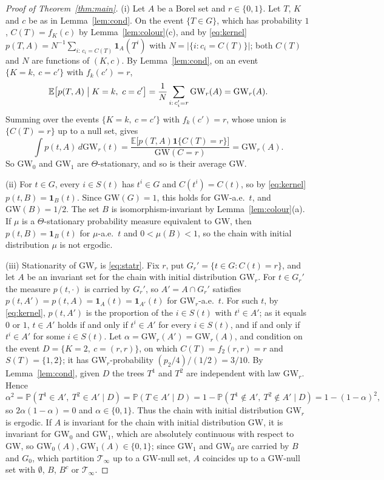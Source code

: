 \documentclass[11pt]{amsart}
\theoremstyle{remark}
\numberwithin{equation}{section}
\newcommand{\Pp}{\mathbb P}
\newcommand{\E}{\mathbb E}
\newcommand{\T}{\mathcal T}
\newcommand{\GW}{\mathrm{GW}}
\newcommand{\one}{\mathbf 1}
\begin{document}
\begin{proof}[Proof of Theorem~\ref{thm:main}]
(i) Let $A$ be a Borel set and $r\in\{0,1\}$. Let $T$, $K$ and $c$ be as in Lemma~\ref{lem:cond}. On the event $\{T\in G\}$, which has probability $1$, $C(T)=f_K(c)$ by Lemma~\ref{lem:colour}(c), and by \eqref{eq:kernel} $p(T,A)=N^{-1}\sum_{i:\,c_i=C(T)}\one_A(T^i)$ with $N=|\{i:c_i=C(T)\}|$; both $C(T)$ and $N$ are functions of $(K,c)$. By Lemma~\ref{lem:cond}, on an event $\{K=k,\ c=c'\}$ with $f_k(c')=r$,
\[
\E\bigl[p(T,A)\bigm|K=k,\ c=c'\bigr]=\frac1N\sum_{i:\,c'_i=r}\GW_r(A)=\GW_r(A).
\]
Summing over the events $\{K=k,\ c=c'\}$ with $f_k(c')=r$, whose union is $\{C(T)=r\}$ up to a null set, gives
\begin{equation}\label{eq:statr}
\int p(t,A)\,d\GW_r(t)=\frac{\E\bigl[p(T,A)\one\{C(T)=r\}\bigr]}{\GW(C=r)}=\GW_r(A).
\end{equation}
So $\GW_0$ and $\GW_1$ are $\Theta$-stationary, and so is their average $\GW$.

(ii) For $t\in G$, every $i\in S(t)$ has $t^i\in G$ and $C(t^i)=C(t)$, so by \eqref{eq:kernel} $p(t,B)=\one_B(t)$. Since $\GW(G)=1$, this holds for $\GW$-a.e.\ $t$, and $\GW(B)=1/2$. The set $B$ is isomorphism-invariant by Lemma~\ref{lem:colour}(a). If $\mu$ is a $\Theta$-stationary probability measure equivalent to $\GW$, then $p(t,B)=\one_B(t)$ for $\mu$-a.e.\ $t$ and $0<\mu(B)<1$, so the chain with initial distribution $\mu$ is not ergodic.

(iii) Stationarity of $\GW_r$ is \eqref{eq:statr}. Fix $r$, put $G_r'=\{t\in G:C(t)=r\}$, and let $A$ be an invariant set for the chain with initial distribution $\GW_r$. For $t\in G_r'$ the measure $p(t,\cdot)$ is carried by $G_r'$, so $A'=A\cap G_r'$ satisfies $p(t,A')=p(t,A)=\one_A(t)=\one_{A'}(t)$ for $\GW_r$-a.e.\ $t$. For such $t$, by \eqref{eq:kernel}, $p(t,A')$ is the proportion of the $i\in S(t)$ with $t^i\in A'$; as it equals $0$ or $1$, $t\in A'$ holds if and only if $t^i\in A'$ for every $i\in S(t)$, and if and only if $t^i\in A'$ for some $i\in S(t)$. Let $\alpha=\GW_r(A')=\GW_r(A)$, and condition on the event $D=\{K=2,\ c=(r,r)\}$, on which $C(T)=f_2(r,r)=r$ and $S(T)=\{1,2\}$; it has $\GW_r$-probability $(p_2/4)/(1/2)=3/10$. By Lemma~\ref{lem:cond}, given $D$ the trees $T^1$ and $T^2$ are independent with law $\GW_r$. Hence
\[
\alpha^2=\Pp(T^1\in A',\ T^2\in A'\mid D)=\Pp(T\in A'\mid D)=1-\Pp(T^1\notin A',\ T^2\notin A'\mid D)=1-(1-\alpha)^2 ,
\]
so $2\alpha(1-\alpha)=0$ and $\alpha\in\{0,1\}$. Thus the chain with initial distribution $\GW_r$ is ergodic. If $A$ is invariant for the chain with initial distribution $\GW$, it is invariant for $\GW_0$ and $\GW_1$, which are absolutely continuous with respect to $\GW$, so $\GW_0(A),\GW_1(A)\in\{0,1\}$; since $\GW_1$ and $\GW_0$ are carried by $B$ and $G_0$, which partition $\T_\infty$ up to a $\GW$-null set, $A$ coincides up to a $\GW$-null set with $\emptyset$, $B$, $B^c$ or $\T_\infty$.
\end{proof}
\end{document}
